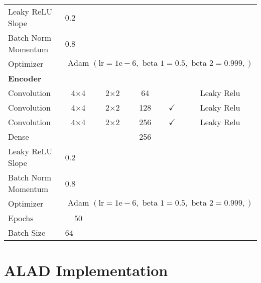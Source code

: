 \begin{longtable}[c]{@{}lccccc@{}}
	Leaky ReLU Slope & \multicolumn{5}{l}{0.2} \\
	Batch Norm Momentum & \multicolumn{5}{l}{0.8} \\
	Optimizer & \multicolumn{5}{l}{$\text { Adam }(\mathrm{lr}=1 \mathrm{e}-6, \text { beta } 1=0.5, \text { beta } 2=0.999,)$} \\ \hline
	\multicolumn{6}{l}{\textbf{Encoder}} \\
	Convolution & \multicolumn{1}{c}{4$\times$4} & 2$\times$2 & 64 &  & Leaky Relu \\
	Convolution & \multicolumn{1}{c}{4$\times$4} & 2$\times$2 & 128 & $\checkmark$ & Leaky Relu \\
	Convolution & \multicolumn{1}{c}{4$\times$4} & 2$\times$2 & 256 & $\checkmark$ & Leaky Relu \\
	Dense & \multicolumn{1}{c}{} &  & 256 &  &  \\ \hline
	Leaky ReLU Slope & \multicolumn{5}{l}{0.2} \\
	Batch Norm Momentum & \multicolumn{5}{l}{0.8} \\
	Optimizer & \multicolumn{5}{l}{$\text { Adam }(\mathrm{lr}=1 \mathrm{e}-6, \text { beta } 1=0.5, \text { beta } 2=0.999,)$} \\ \hline
	Epochs & 50 & \multicolumn{1}{l}{} & \multicolumn{1}{l}{} & \multicolumn{1}{l}{} & \multicolumn{1}{l}{} \\
	Batch Size & \multicolumn{5}{l}{64}
	
\end{longtable}


\section{ALAD Implementation}
\label{app:alad}

